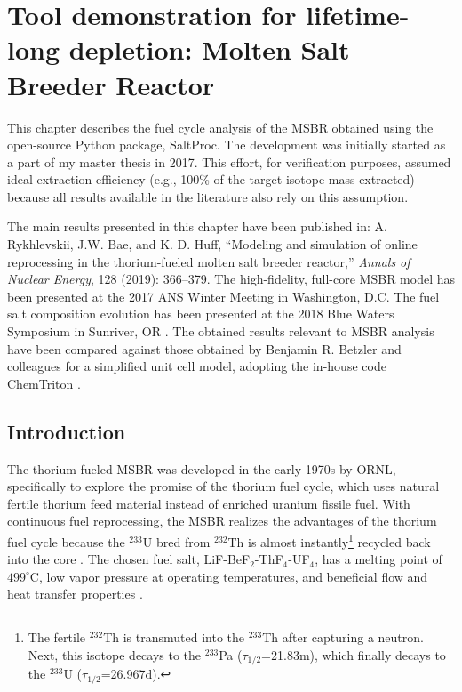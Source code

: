 \chapter{Tool demonstration for lifetime-long depletion: Molten Salt Breeder 
Reactor}

This chapter describes the fuel cycle analysis of the \gls{MSBR} obtained 
using the open-source Python package, SaltProc. The development was initially 
started as a part of my master thesis \cite{rykhlevskii_advanced_2018} in 
2017. This effort, for verification purposes, assumed ideal extraction 
efficiency (e.g., 100\% of the target isotope mass extracted) because all 
results available in the literature also rely on this assumption.

The main results presented in this chapter have been published in: A. 
Rykhlevskii, J.W. Bae, and K. D. Huff, ``Modeling and simulation of online 
reprocessing in the thorium-fueled molten salt breeder reactor,'' 
\textit{Annals of Nuclear Energy}, 128 (2019): 366--379. The high-fidelity, 
full-core \gls{MSBR} model has been presented at the 2017 \gls{ANS} Winter 
Meeting in Washington, D.C. The fuel salt composition evolution has been 
presented at the 2018 Blue Waters Symposium in Sunriver, OR 
\cite{rykhlevskii_computational_2018-1}. The obtained results relevant to 
\gls{MSBR} analysis have been compared against those obtained by Benjamin R. 
Betzler and colleagues for a simplified unit cell model, adopting the in-house 
code ChemTriton \cite{betzler_molten_2017}. 


\section{Introduction}
The thorium-fueled \gls{MSBR} was developed in the early 1970s by \gls{ORNL},  
specifically to explore the promise of the thorium fuel cycle, which uses 
natural fertile thorium feed material instead of enriched uranium fissile 
fuel. With continuous fuel reprocessing, the \gls{MSBR} realizes the 
advantages of the thorium fuel cycle because the $^{233}$U bred from 
$^{232}$Th is almost instantly\footnote{\space The fertile $^{232}$Th is 
transmuted into the $^{233}$Th after capturing a neutron. Next, this isotope 
decays to the $^{233}$Pa ($\tau_{1/2}$=21.83m), which finally decays to the 
$^{233}$U ($\tau_{1/2}$=26.967d).} recycled back into the core  
\cite{betzler_modeling_2016}. The chosen fuel salt, 
LiF-BeF$_2$-ThF$_4$-UF$_4$, has a melting point of $499^\circ$C, low vapor 
pressure at operating temperatures, and beneficial flow and heat transfer 
properties \cite{robertson_conceptual_1971}. 

